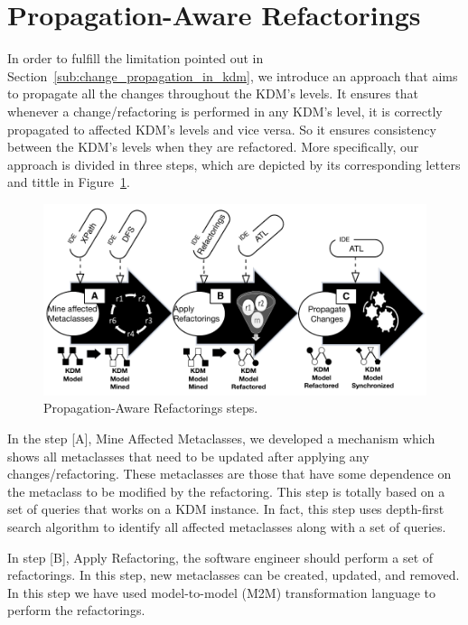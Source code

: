 
\section{Propagation-Aware Refactorings} %
\label{sec:the_approach}

In order to fulfill the limitation pointed out in Section~\ref{sub:change_propagation_in_kdm}, we introduce an approach that aims to propagate all the changes throughout the KDM's levels. It ensures that whenever a change/refactoring is performed in any KDM's level, it is correctly propagated to affected KDM's levels and vice versa. So it ensures consistency between the KDM's levels when they are refactored. 
More specifically, our approach is divided in three steps, which are depicted by its corresponding letters and tittle in Figure~\ref{fig:approach}.

\begin{figure}[h]
	\centering
	\includegraphics[scale=0.56]{figuras/allStepApproachKDMPropagation}
	\caption{Propagation-Aware Refactorings steps.}
	\label{fig:approach}
\end{figure}

In the step [A], Mine Affected Metaclasses, we developed a mechanism which shows all metaclasses that need to be updated after applying any changes/refactoring. These metaclasses are those that have some dependence on the metaclass to be modified by the refactoring. This step is totally based on a set of queries that works on a KDM instance. In fact, this step uses depth-first search algorithm to identify all affected metaclasses along with a set of queries.

In step [B], Apply Refactoring, the software engineer should perform a set of refactorings.  In this step, new metaclasses can be created, updated, and removed. %
In this step we have used model-to-model (M2M) transformation language to perform the refactorings.

